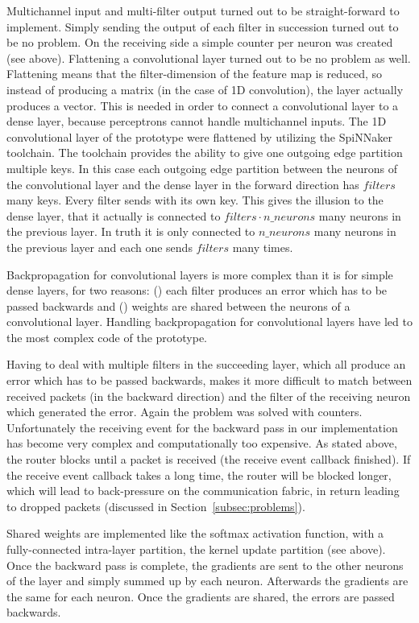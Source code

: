 \documentclass[]{article}
\begin{document}
Multichannel input and multi-filter output turned out to be
straight-forward to implement.
Simply sending the output of each filter in succession turned out to
be no problem.
On the receiving side a simple counter per neuron was created
(see above).
Flattening a convolutional layer turned out to be no problem as well.
Flattening means that the filter-dimension of the feature map is
reduced, so instead of producing a matrix (in the case of 1D
convolution), the layer actually produces a vector.
This is needed in order to connect a convolutional layer to a dense
layer, because perceptrons cannot handle multichannel inputs.
The 1D convolutional layer of the prototype were flattened by
utilizing the SpiNNaker toolchain.
The toolchain provides the ability to give one outgoing edge partition
multiple keys.
In this case each outgoing edge partition between the neurons of the
convolutional layer and the dense layer in the forward direction has
$filters$ many keys.
Every filter sends with its own key.
This gives the illusion to the dense layer, that it actually is
connected to $filters \cdot n\_neurons$ many neurons in the previous
layer.
In truth it is only connected to $n\_neurons$ many neurons in the
previous layer and each one sends $filters$ many times.

Backpropagation for convolutional layers is more complex than it is
for simple dense layers, for two reasons: () each
filter produces an error which has to be passed backwards and
() weights are shared between the neurons of a
convolutional layer.
Handling backpropagation for convolutional layers have led to the
most complex code of the prototype.

Having to deal with multiple filters in the succeeding layer, which
all produce an error which has to be passed backwards, makes it more
difficult to match between received packets (in the backward
direction) and the filter of the receiving neuron which generated the
error.
Again the problem was solved with counters.
Unfortunately the receiving event for the backward pass in our
implementation has become very complex and computationally too
expensive.
As stated above, the router blocks until a packet is received
(the receive event callback finished).
If the receive event callback takes a long time, the router will be
blocked longer, which will lead to back-pressure on the communication
fabric, in return leading to dropped packets (discussed in
Section~\ref{subsec:problems}).

Shared weights are implemented like the softmax activation function,
with a fully-connected intra-layer partition, the kernel update
partition (see above).
Once the backward pass is complete, the gradients are sent to the
other neurons of the layer and simply summed up by each neuron.
Afterwards the gradients are the same for each neuron.
Once the gradients are shared, the errors are passed backwards.
\end{document}
